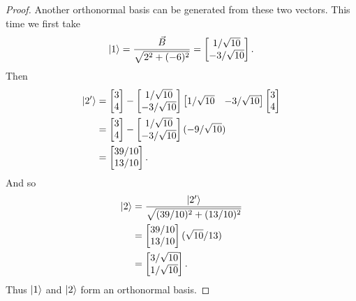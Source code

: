 \begin{proof}
Another orthonormal basis can be generated from these two vectors. This time we first take
\begin{equation*}
    \ket{1} = \frac{\vec{B}}{\sqrt{2^2 + (-6)^2}} = 
    \begin{bmatrix}
    1/\sqrt{10} \\
    -3/\sqrt{10}
    \end{bmatrix}.
\end{equation*}
Then 
\begin{align*}
    \ket{2'} &= 
    \begin{bmatrix}
    3 \\
    4
    \end{bmatrix}
    -
    \begin{bmatrix}
    1/\sqrt{10} \\
    -3/\sqrt{10}
    \end{bmatrix}
    \begin{bmatrix}
    1/\sqrt{10} & -3/\sqrt{10}
    \end{bmatrix}
    \begin{bmatrix}
    3 \\
    4
    \end{bmatrix} \\
    &= 
    \begin{bmatrix}
    3 \\
    4
    \end{bmatrix}
    -
    \begin{bmatrix}
    1/\sqrt{10} \\
    -3/\sqrt{10}
    \end{bmatrix}
    (-9/\sqrt{10}) \\
    &= 
    \begin{bmatrix}
    39/10 \\
    13/10
    \end{bmatrix}.
\end{align*}
And so
\begin{align*}
    \ket{2} &= \frac{\ket{2'}}{\sqrt{(39/10)^2 + (13/10)^2}} \\
    &= 
    \begin{bmatrix}
    39/10 \\
    13/10
    \end{bmatrix}
    (\sqrt{10}/13) \\
    &= 
    \begin{bmatrix}
    3/\sqrt{10} \\
    1/\sqrt{10}
    \end{bmatrix}.
\end{align*}
Thus $\ket{1}$ and $\ket{2}$ form an orthonormal basis.
\end{proof}


